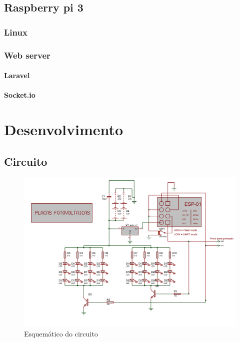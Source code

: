 \documentclass[
	12pt,				%
	openany,			%
	twoside,			%
	a4paper,			%
	english,			%
	french,				%
	spanish,			%
	brazil,				%
	]{abntex2}
\begin{document}
\chapter{Raspberry pi 3}

\section{Linux}

\section{Web server}
\subsection{Laravel}
\subsection{Socket.io}

\part{Desenvolvimento}
\chapter{Circuito}
\begin{figure}[ht!]
  \includegraphics[width=450pt]{images/circuit.png}
  \caption{Esquemático do circuito}
\end{figure}
\end{document}
